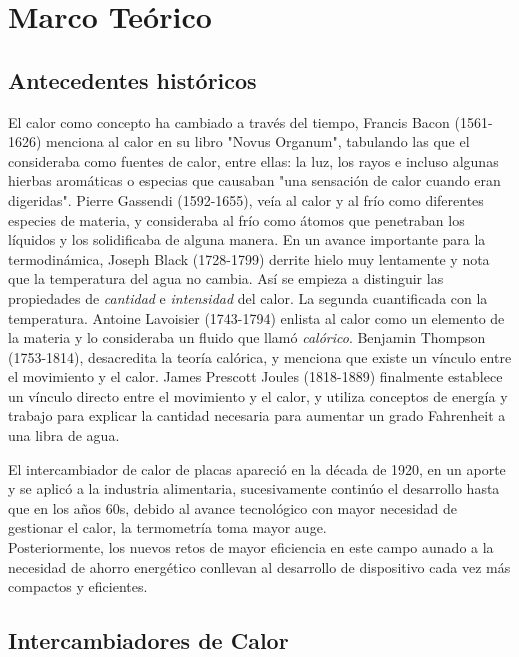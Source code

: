 \documentclass[12pt,letterpaper]{article}     %
\begin{document}
\newpage

\section{Marco Teórico}

\subsection{Antecedentes históricos}
El calor como concepto ha cambiado a través del tiempo, Francis Bacon (1561-1626) menciona al calor en su libro "Novus Organum", tabulando las que el consideraba como fuentes de calor, entre ellas: la luz, los rayos e incluso algunas hierbas aromáticas o especias que causaban "una sensación de calor cuando eran digeridas".
Pierre Gassendi (1592-1655), veía al calor y al frío como diferentes especies de materia, y consideraba al frío como átomos que penetraban los líquidos y los solidificaba de alguna manera.
En un avance importante para la termodinámica, Joseph Black (1728-1799) derrite hielo muy lentamente y nota que la temperatura del agua no cambia. Así se empieza a distinguir las propiedades de \textit{cantidad} e \textit{intensidad} del calor. La segunda cuantificada con la temperatura. 
Antoine Lavoisier (1743-1794) enlista al calor como un elemento de la materia y lo consideraba un fluido que llamó \textit{calórico}. \cite[p.\ 27]{Cengel}
Benjamin Thompson (1753-1814), desacredita la teoría calórica, y menciona que existe un vínculo entre el movimiento y el calor.
James Prescott Joules (1818-1889) finalmente establece un vínculo directo entre el movimiento y el calor, y utiliza conceptos de energía y trabajo para explicar la cantidad necesaria para aumentar un grado Fahrenheit a una libra de agua.


El intercambiador de calor de placas apareció en la década de 1920, en un aporte y se aplicó a la industria alimentaria, sucesivamente continúo el desarrollo hasta que en los años 60s, debido al avance tecnológico con mayor necesidad de gestionar el calor, la termometría toma mayor auge.\\
Posteriormente, los nuevos retos de mayor eficiencia en este campo  aunado a la necesidad de ahorro energético conllevan al desarrollo de dispositivo cada vez más compactos y eficientes.

\subsection{Intercambiadores de Calor}
\end{document}
